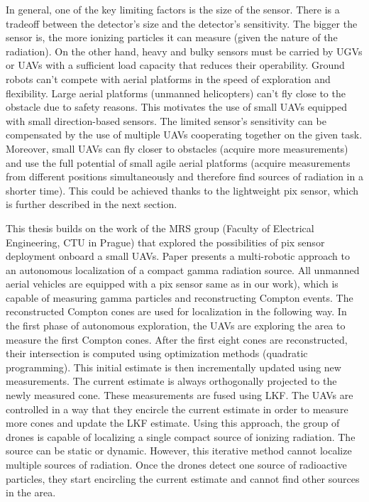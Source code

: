 In general, one of the key limiting factors is the size of the sensor.
There is a tradeoff between the detector's size and the detector's sensitivity.
The bigger the sensor is, the more ionizing particles it can measure (given the nature of the radiation).
On the other hand, heavy and bulky sensors must be carried by \ac{UGV}s or \ac{UAV}s with a sufficient load capacity that reduces their operability. 
Ground robots can't compete with aerial platforms in the speed of exploration and flexibility. 
Large aerial platforms (unmanned helicopters) can't fly close to the obstacle due to safety reasons.
This motivates the use of small \ac{UAV}s equipped with small direction-based sensors.
The limited sensor's sensitivity can be compensated by the use of multiple \ac{UAV}s cooperating together on the given task.
Moreover, small \ac{UAV}s can fly closer to obstacles (acquire more measurements) and use the full potential of small agile aerial platforms (acquire measurements from different positions simultaneously and therefore find sources of radiation in a shorter time).
This could be achieved thanks to the lightweight \ac{pix} \cite{baca2019timepix} sensor, which is further described in the next section.

This thesis builds on the work of the MRS group (Faculty of Electrical Engineering, CTU in Prague) that explored the possibilities of \ac{pix} sensor deployment onboard a small \ac{UAV}s. 
Paper \cite{baca2021gamma} presents a multi-robotic approach to an autonomous localization of a compact gamma radiation source. 
All unmanned aerial vehicles are equipped with a \ac{pix} sensor same as in our work), which is capable of measuring gamma particles and reconstructing Compton events. 
The reconstructed Compton cones are used for localization in the following way.
In the first phase of autonomous exploration, the \ac{UAV}s are exploring the area to measure the first Compton cones. 
After the first eight cones are reconstructed, their intersection is computed using optimization methods (quadratic programming). 
This initial estimate is then incrementally updated using new measurements. 
The current estimate is always orthogonally projected to the newly measured cone. 
These measurements are fused using \ac{LKF}. 
The \ac{UAV}s are controlled in a way that they encircle the current estimate in order to measure more cones and update the \ac{LKF} estimate.
Using this approach, the group of drones is capable of localizing a single compact source of ionizing radiation. 
The source can be static or dynamic. 
However, this iterative method cannot localize multiple sources of radiation.
Once the drones detect one source of radioactive particles, they start encircling the current estimate and cannot find other sources in the area.

